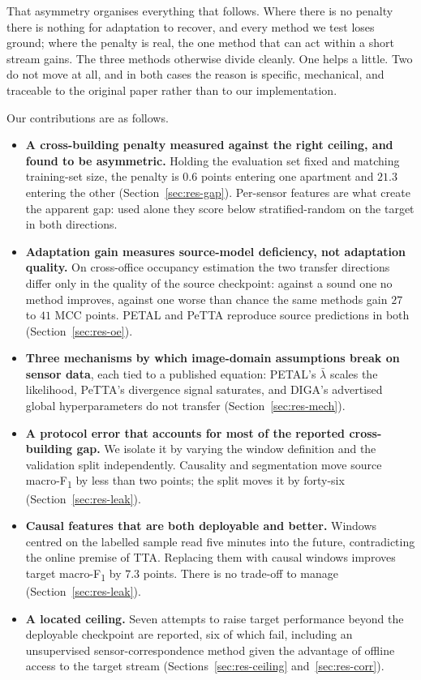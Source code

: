 \documentclass[a4paper,fleqn]{cas-dc}
\newcommand{\macf}{macro-F\textsubscript{1}}
\begin{document}
That asymmetry organises everything that follows. Where there is no penalty there is
nothing for adaptation to recover, and every method we test loses ground; where the
penalty is real, the one method that can act within a short stream gains. The three
methods otherwise divide cleanly. One helps a little. Two do not move at all, and in both
cases the reason is specific, mechanical, and traceable to the original paper rather than
to our implementation.

Our contributions are as follows.

\begin{itemize}
\item \textbf{A cross-building penalty measured against the right ceiling, and found to
  be asymmetric.} Holding the evaluation set fixed and matching training-set size, the
  penalty is $0.6$ points entering one apartment and $21.3$ entering the other
  (Section~\ref{sec:res-gap}). Per-sensor features are what create the apparent gap:
  used alone they score below stratified-random on the target in both directions.

\item \textbf{Adaptation gain measures source-model deficiency, not adaptation quality.} On cross-office
  occupancy estimation the two transfer directions differ only in the quality of the
  source checkpoint: against a sound one no method improves, against one worse than
  chance the same methods gain $27$ to $41$ MCC points. PETAL and PeTTA reproduce source
  predictions in both (Section~\ref{sec:res-oe}).

\item \textbf{Three mechanisms by which image-domain assumptions break on sensor data},
  each tied to a published equation: PETAL's $\bar\lambda$ scales the likelihood, PeTTA's
  divergence signal saturates, and DIGA's advertised global hyperparameters do not
  transfer (Section~\ref{sec:res-mech}).

\item \textbf{A protocol error that accounts for most of the reported cross-building gap.}
  We isolate it by varying the window definition and the validation split independently.
  Causality and segmentation move source \macf{} by less than two points; the split moves
  it by forty-six (Section~\ref{sec:res-leak}).

\item \textbf{Causal features that are both deployable and better.} Windows centred on the
  labelled sample read five minutes into the future, contradicting the online premise of
  TTA. Replacing them with causal windows improves target \macf{} by $7.3$ points. There
  is no trade-off to manage (Section~\ref{sec:res-leak}).

\item \textbf{A located ceiling.} Seven attempts to raise target performance beyond the
  deployable checkpoint are reported, six of which fail, including an unsupervised
  sensor-correspondence method given the advantage of offline access to the target
  stream (Sections~\ref{sec:res-ceiling} and~\ref{sec:res-corr}).
\end{itemize}
\end{document}
